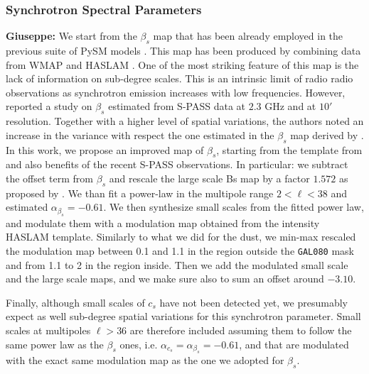  
\subsubsection{Synchrotron Spectral Parameters}\label{sec:beta_s}
 \textbf{Giuseppe:   } 
 We start from the $\beta_s$ map that has been already employed in the previous suite of PySM models \citet{Thorne:2017}. This map has been produced by combining data from WMAP and HASLAM \citep{mivilledeschenes:2008}. One of the most striking feature of this map is  the lack of information on sub-degree scales. This is an intrinsic limit of radio radio observations as   synchrotron emission  increases  with low frequencies.  However, \citet{Krachmalnicoff:2018} reported a study  on $\beta_s$ estimated from S-PASS data at $2.3 $ GHz and at $10'$ resolution.   Together with a higher level of spatial variations, the authors noted an increase in the variance with respect the one estimated in the $\beta_s$ map derived by \citet{mivilledeschenes:2008}.  In this work, we propose an improved  map of $\beta_s $, starting from the template from \citet{mivilledeschenes:2008} and also benefits of  the recent  S-PASS observations. In particular:  we subtract the offset term from $\beta_s$  and rescale the large scale Bs map by a factor $1.572$ as proposed by \citet{Krachmalnicoff:2018}. We than fit a  power-law  in the multipole range  $2<\ell<38$ and estimated $\alpha_{\beta_s}=-0.61 $. We then synthesize  small scales  from the fitted power law,  and modulate them with a modulation map obtained from the intensity HASLAM template. Similarly to what we did for the dust, we  min-max rescaled the modulation map  between 0.1 and 1.1 in the region outside the \texttt{GAL080} mask and from 1.1 to 2 in the region inside. 
 Then we add the modulated small scale  and the  large scale maps, and we make sure also to sum  an offset around $-3.10$.
 
Finally, although small scales of $c_s$  have not been detected yet, we presumably expect as well sub-degree spatial variations for this synchrotron parameter. Small  scales at multipoles $\ell>36$  are therefore  included   assuming them to follow  the same power law as  the $\beta_s$ ones,  i.e. $\alpha _{c_s}=\alpha _{\beta_s} = -0.61$, and that are  modulated with the exact same modulation map as the one we  adopted for $\beta_s$.